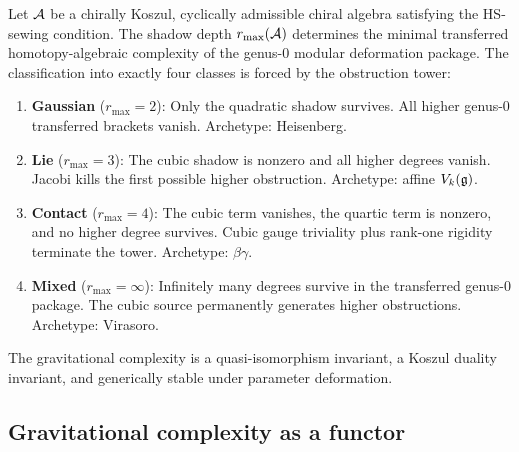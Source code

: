 \begin{maintheorem}
\label{thm:thqg-g2-main}
\ClaimStatusProvedHere
{}
Let $\mathcal{A}$ be a chirally Koszul, cyclically admissible chiral
algebra satisfying the HS-sewing condition.
The shadow depth $r_{\max}(\mathcal{A})$ determines the minimal
transferred homotopy-algebraic complexity of the genus-$0$
modular deformation package.
The classification into exactly four classes is forced by the
obstruction tower:
\begin{enumerate}[label=\textup{(\roman*)}]
\item \textbf{Gaussian} ($r_{\max} = 2$):
 Only the quadratic shadow survives.
 All higher genus-$0$ transferred brackets vanish.
 Archetype: Heisenberg.

\item \textbf{Lie} ($r_{\max} = 3$):
 The cubic shadow is nonzero and all higher degrees vanish.
 Jacobi kills the first possible higher obstruction.
 Archetype: affine $V_k(\mathfrak{g})$.

\item \textbf{Contact} ($r_{\max} = 4$):
 The cubic term vanishes, the quartic term is nonzero,
 and no higher degree survives.
 Cubic gauge triviality plus rank-one rigidity terminate the tower.
 Archetype: $\beta\gamma$.

\item \textbf{Mixed} ($r_{\max} = \infty$):
 Infinitely many degrees survive in the transferred
 genus-$0$ package.
 The cubic source permanently generates higher obstructions.
 Archetype: Virasoro.
\end{enumerate}
The gravitational complexity is a quasi-isomorphism invariant,
a Koszul duality invariant, and generically stable under
parameter deformation.
\end{maintheorem}



\subsection{Gravitational complexity as a functor}
\label{subsec:thqg-envelope-shadow}

